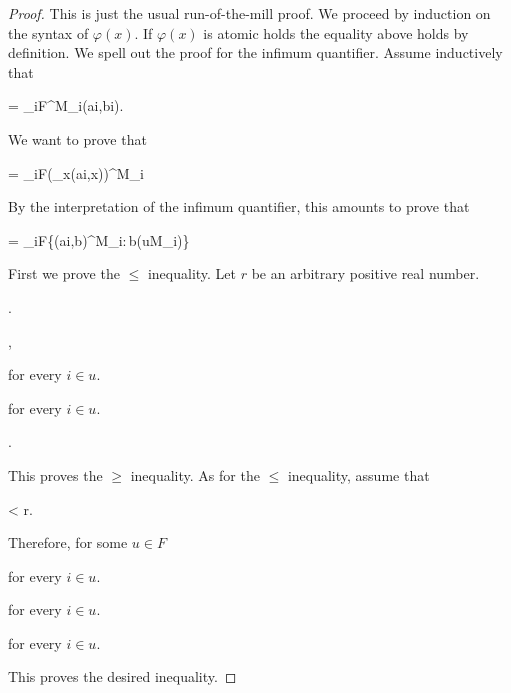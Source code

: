 \documentclass[12pt,letterpaper,oneside,reqno]{amsart}
\theoremstyle{plain}
\theoremstyle{remark}
\begin{document}
\begin{proof}
This is just the usual run-of-the-mill proof.
We proceed by induction on the syntax of $\varphi(x)$.
If $\varphi(x)$ is atomic holds the equality above holds by definition.
We spell out the proof for the infimum quantifier.
Assume inductively that

{=}
{\lim_{i\uparrow F}\varphi^{M_i}\big(\hat ai,\hat bi\big).}

We want to prove that 

{=}
{\lim_{i\uparrow F}\Big(\bigwedge_x\varphi\big(\hat ai,x\big)\Big)^{M_i}}

By the interpretation of the infimum quantifier, this amounts to prove that

{=}
{\lim_{i\uparrow F}\inf\big\{\varphi\big(\hat ai,b\big)^{M_i}:\,b\in(uM_i)\big\}}

First we prove the $\le$ inequality.
Let $r$ be an arbitrary positive real number.

.

,

\quad for every $i\in u$.

\quad for every $i\in u$.

.

\smallskip
This proves the $\ge$ inequality.
As for the $\le$ inequality, assume that
\smallskip

{<}
{r.}

Therefore, for some $u\in F$

\quad for every $i\in u$.

\quad for every $i\in u$.

\quad for every $i\in u$.



This proves the desired inequality.
\end{proof}
\end{document}
